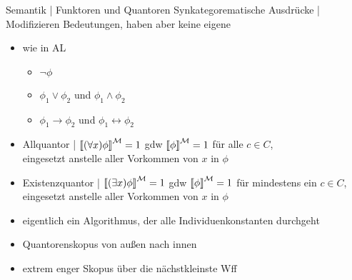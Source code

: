\begin{frame}
  {Semantik | Funktoren und Quantoren}
  \onslide<+->
  \onslide<+->
  Synkategorematische Ausdrücke | \alert{Modifizieren Bedeutungen}, haben aber keine eigene\\
  \Halbzeile
  \begin{itemize}[<+->]
    \item wie in AL
      \begin{itemize}[<+->]
        \item \alert{$\neg\phi$}
        \item \alert{$\phi_1\vee\phi_2$} und \alert{$\phi_1\wedge\phi_2$}
        \item \alert{$\phi_1\rightarrow\phi_2$} und \alert{$\phi_1\leftrightarrow\phi_2$}
      \end{itemize}
      \Halbzeile
    \item Allquantor | \alert{${\llbracket{}(\forall x)\phi\rrbracket}^{\mathcal{M}}=1$} gdw \alert{${\llbracket{}\phi\rrbracket}^{\mathcal{M}}=1$} für alle $c\in C$,\\
      eingesetzt anstelle aller Vorkommen von $x$ in $\phi$
    \item Existenzquantor | \alert{${\llbracket{}(\exists x)\phi\rrbracket}^{\mathcal{M}}=1$} gdw \alert{${\llbracket{}\phi\rrbracket}^{\mathcal{M}}=1$} für mindestens ein $c\in C$,\\
      eingesetzt anstelle aller Vorkommen von $x$ in $\phi$
      \Halbzeile
    \item eigentlich ein Algorithmus, der alle Individuenkonstanten durchgeht
    \item Quantorenskopus von \alert{außen nach innen}
    \item \alert{extrem enger Skopus über die nächstkleinste Wff} 
  \end{itemize}
\end{frame}

